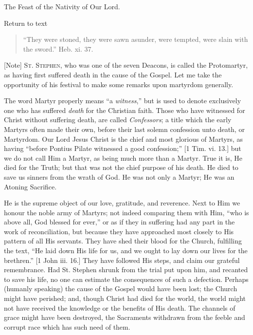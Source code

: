 
The Feast of the Nativity of Our Lord.

Return to text


\begin{quote}

``They were stoned, they were sawn asunder, were tempted,
were slain with the sword.'' Heb. xi. 37.

\end{quote}

[Note] S\textsc{t}.
S\textsc{tephen}, who was one
of the seven Deacons, is called the Protomartyr, as having first
suffered death in the cause of the Gospel. Let me take the opportunity
of his festival to make some remarks upon martyrdom generally.

The word Martyr properly means ``a \emph{witness},'' but is
used to denote exclusively one who has suffered \emph{death} for the
Christian faith. Those who have witnessed for Christ without suffering
death, are called \emph{Confessors}; a title which the early Martyrs
often made their own, before their last solemn confession unto death,
or Martyrdom. Our Lord Jesus Christ is the chief and most glorious of
Martyrs, as having ``before Pontius Pilate witnessed a good
confession;'' [1 Tim. vi. 13.] but we do not call Him a Martyr, as
being much more than a Martyr. True it is, He died for the Truth; but
that was not the chief purpose of his death. He died to save us
sinners from the wrath of God. He was not only a Martyr; He was an
Atoning Sacrifice.

He is the supreme object of our love, gratitude, and reverence.
Next to Him we honour the noble army of Martyrs; not indeed comparing
them with Him, ``who is above all, God blessed for ever,'' or
as if they in suffering had any part in the work of reconciliation,
but because they have approached most closely to His pattern of all
His servants. They have shed their blood for the Church, fulfilling
the text, ``He laid down His life for us, and we ought to lay down
our lives for the brethren.'' [1 John iii. 16.] They have followed
His steps, and claim our grateful remembrance. Had St. Stephen shrunk
from the trial put upon him, and recanted to save his life, no one can
estimate the consequences of such a defection. Perhaps (humanly
speaking) the cause of the Gospel would have been lost; the Church
might have perished; and, though Christ had died for the world, the
world might not have received the knowledge or the benefits of His
death. The channels of grace might have been destroyed, the Sacraments
withdrawn from the feeble and corrupt race which has such need of
them.


